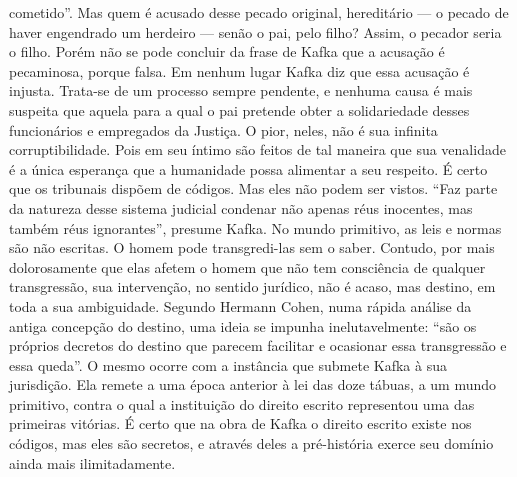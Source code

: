 cometido''. Mas quem é acusado desse pecado original, hereditário --- o
pecado de haver engendrado um herdeiro --- senão o pai, pelo filho?
Assim, o pecador seria o filho. Porém não se pode concluir da frase de
Kafka que a acusação é pecaminosa, porque falsa. Em nenhum lugar Kafka
diz que essa acusação é injusta. Trata-se de um processo sempre
pendente, e nenhuma causa é mais suspeita que aquela para a qual o pai
pretende obter a solidariedade desses funcionários e empregados da
Justiça. O pior, neles, não é sua infinita corruptibilidade. Pois em seu
íntimo são feitos de tal maneira que sua venalidade é a única esperança
que a humanidade possa alimentar a seu respeito. É certo que os
tribunais dispõem de códigos. Mas eles não podem ser vistos. ``Faz parte
da natureza desse sistema judicial condenar não apenas réus inocentes,
mas também réus ignorantes'', presume Kafka. No mundo primitivo, as leis
e normas são não escritas. O homem pode transgredi-las sem o saber.
Contudo, por mais dolorosamente que elas afetem o homem que não tem
consciência de qualquer transgressão, sua intervenção, no sentido
jurídico, não é acaso, mas destino, em toda a sua ambiguidade. Segundo
Hermann Cohen, numa rápida análise da antiga concepção do destino, uma
ideia se impunha inelutavelmente: ``são os próprios decretos do destino
que parecem facilitar e ocasionar essa transgressão e essa queda''. O
mesmo ocorre com a instância que submete Kafka à sua jurisdição. Ela
remete a uma época anterior à lei das doze tábuas, a um mundo primitivo,
contra o qual a instituição do direito escrito representou uma das
primeiras vitórias. É certo que na obra de Kafka o direito escrito
existe nos códigos, mas eles são secretos, e através deles a
pré-história exerce seu domínio ainda mais ilimitadamente.

